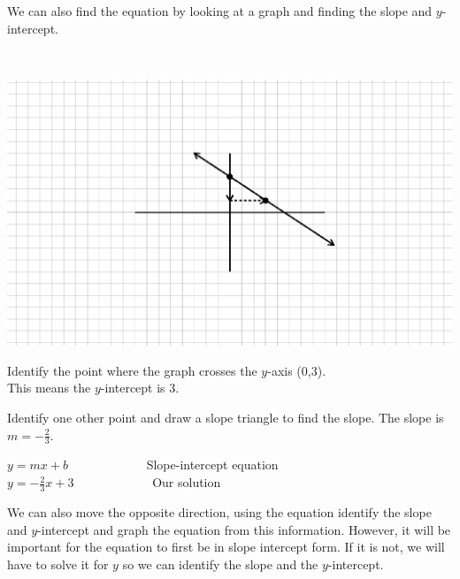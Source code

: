  We can also find the equation by looking at a graph and finding the slope and
$y$-intercept.

\begin{example}\label{Lin57}
~\end{example}

  \begin{multicols}{2}
    \includegraphics[scale=.9,bb = 115 65 310 190, clip=true]{II_1_4a-1.eps}
    
 Identify the point where the graph crosses the $y$-axis (0,3).\\ This means the $y$-intercept is 3.\pp
    
 Identify one other point and draw a slope triangle to find the slope.\pp
The slope is $m=- \frac{2}{3}$.
  \end{multicols}

\begin{center}
  $y = m x + b\qquad\qquad\qquad$ Slope-intercept equation\\
  $y = - \frac{2}{3} x + 3\qquad\qquad\qquad$ Our solution\qquad\qquad~~~
\end{center}


 We can also move the opposite direction, using the equation identify the slope
and $y$-intercept and graph the equation from this information. However, it will
be important for the equation to first be in slope intercept form. If it is
not, we will have to solve it for $y$ so we can identify the slope and the
$y$-intercept.

